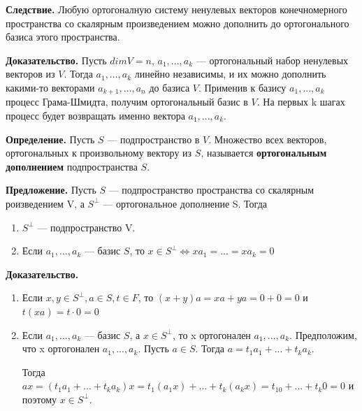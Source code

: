 \documentclass[a4paper]{article}
\begin{document}
    \begin{htheorem}
        \textbf{Следствие.} Любую ортогоналную систему ненулевых векторов конечномерного пространства со скалярным произведением можно дополнить до ортогонального базиса этого пространства.
    \end{htheorem}

    \begin{hproof}
        \textbf{Доказательство.} Пусть $dimV = n$, $a_1, ..., a_k$ --- ортогональный набор ненулевых векторов из $V$. Тогда $a_1, ..., a_k$ линейно независимы, и их можно дополнить какими-то векторами $a_{k+1}, ..., a_n$ до базиса $V$. Применив к базису $a_1, ..., a_k$ процесс Грама-Шмидта, получим ортогональный базис в $V$. На первых k шагах процесс будет возвращать именно вектора $a_1, ..., a_k$.
    \end{hproof}

    \textbf{Определение.} Пусть $S$ --- подпространство в $V$. Множество всех векторов, ортогональных к произвольному вектору из $S$, называется \textbf{ортогональным дополнением} подпространства $S$.

    \begin{htheorem}
        \textbf{Предложение.} Пусть $S$ --- подпространство пространства со скалярным роизведением V, а $S^{\bot}$ --- ортогональное дополнение S. Тогда
        \begin{enumerate}
            \item $S^{\bot}$ --- подпространство V.
            \item Если $a_1, ..., a_k$ --- базис $S$, то  $x \in S^{\bot} \Leftrightarrow xa_1 = ... = xa_k = 0$
        \end{enumerate}
    \end{htheorem}

    \begin{hproof}
        \textbf{Доказательство.}

        \begin{enumerate}
            \item Если $x, y \in S^{\bot}, a \in S, t \in F$, то $(x+y)a = xa+ya = 0+0=0$ и $t(xa) = t \cdot 0 = 0$

            \item Если $a_1, ..., a_k$ --- базис $S$, а $x \in S^{\bot}$, то x ортогонален $a_1, ..., a_k$. Предположим, что x ортогонален $a_1, ..., a_k$. Пусть $a \in S$. Тогда $a = t_1a_1 + ... +t_ka_k$.

            Тогда $ax = (t_1a_1 + ... + t_ka_k)x = t_1(a_1x) + ... + t_k(a_kx) = t_10 + ... + t_k0 = 0$ и поэтому $x \in S^{\bot}$.
        \end{enumerate}
    \end{hproof}
\end{document}
